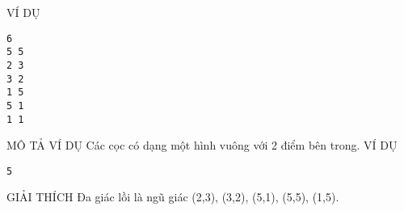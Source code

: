 VÍ DỤ
\begin{verbatim}
6
5 5
2 3
3 2
1 5
5 1
1 1
\end{verbatim}
MÔ TẢ VÍ DỤ
Các cọc có dạng một hình vuông với 2 điểm bên trong.
VÍ DỤ
\begin{verbatim}
5
\end{verbatim}
GIẢI THÍCH
Đa giác lồi là ngũ giác (2,3), (3,2), (5,1), (5,5), (1,5).